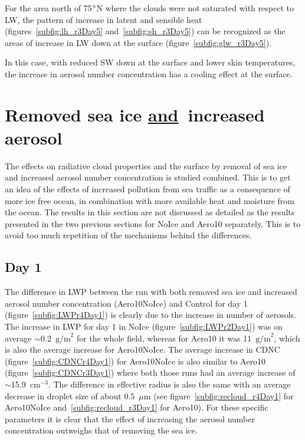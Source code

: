 For the area north of 75$\degree$N where the clouds were not saturated with respect to LW, the pattern of increase in latent and sensible heat (figures~\ref{subfig:lh_r3Day5} and~\ref{subfig:sh_r3Day5}) can be recognized as the areas of increase in LW down at the surface (figure~\ref{subfig:glw_r3Day5}).

In this case, with reduced SW down at the surface and lower skin temperatures, the increase in aerosol number concentration has a cooling effect at the surface.

\clearpage
\section{Removed sea ice \underline{and}~increased aerosol}
The effects on radiative cloud properties and the surface by removal of sea ice and increased aerosol number concentration is studied combined. This is to get an idea of the effects of increased pollution from sea traffic as a consequence of more ice free ocean, in combination with more available heat and moisture from the ocean. The results in this section are not discussed as detailed as the results presented in the two previous sections for NoIce and Aero10 separately. This is to avoid too much repetition of the mechanisms behind the differences.

\subsection{Day 1}
The difference in LWP between the run with both removed sea ice and increased aerosol number concentration (Aero10NoIce) and Control for day 1 (figure~\ref{subfig:LWPr4Day1}) is clearly due to the increase in number of aerosols. The increase in LWP for day 1 in NoIce (figure~\ref{subfig:LWPr2Day1}) was on average $\sim$0.2~$\text{g/m}^2$ for the whole field, whereas for Aero10 it was 11~$\text{g/m}^2$, which is also the average increase for Aero10NoIce. The average increase in CDNC (figure~\ref{subfig:CDNCr4Day1}) for Aero10NoIce is also similar to Aero10 (figure~\ref{subfig:CDNCr3Day1}) where both those runs had an average increase of $\sim$15.9~$\text{cm}^{-3}$. The difference in effective radius is also the same with an average decrease in droplet size of about 0.5~$\mu\text{m}$ (see figure~\ref{subfig:recloud_r4Day1} for Aero10NoIce and~\ref{subfig:recloud_r3Day1} for Aero10). For these specific parameters it is clear that the effect of increasing the aerosol number concentration outweighs that of removing the sea ice.

